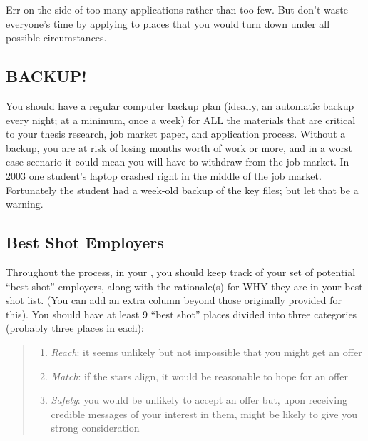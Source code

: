 \documentclass{\classes/econtex}
\begin{document}
Err on the side of too many applications rather than too few.  But
don't waste everyone's time by applying to places that you would turn
down under all possible circumstances.

\hypertarget{backup}{}
\subsection*{BACKUP!}
You should have a regular computer backup plan
(ideally, an automatic backup every night; at a minimum, once a week)
for ALL the materials that are critical to your thesis research,
job market paper, and application process.  Without a backup, you are
at risk of losing months worth of work or more, and in a worst case
scenario it could mean you will have to withdraw from the job market.
\hypertarget{best-shot}{}
In 2003 one student's laptop crashed right in the middle of the job
market.  Fortunately the student had a week-old backup of the key
files; but let that be a warning.

\subsection*{Best Shot Employers}
Throughout the process, in your {\EMW}, you should keep track of your set of potential ``best shot'' employers, along with the rationale(s) for WHY they are in your best shot list.  (You can add an extra column beyond those originally provided for this). You should have at least 9 ``best shot'' places divided into three categories (probably three places in each):

\begin{quote}
\begin{enumerate}
\item \emph{Reach}: it seems unlikely but not impossible that you might get an offer
\item \emph{Match}: if the stars align, it would be reasonable to hope for an offer
  \item \emph{Safety}: you would be unlikely to accept an offer but, upon receiving credible messages of your interest in them, might be likely to give you strong consideration
  \end{enumerate}
  \end{quote}
\end{document}
